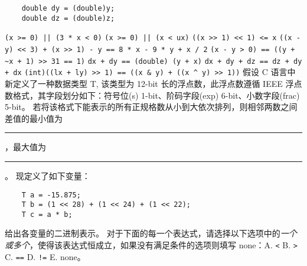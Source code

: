 \begin{problems}
\begin{verbatim}
    double dy = (double)y;
    double dz = (double)z;
		\end{verbatim}
			\qn \verb+(x >= 0) || (3 * x < 0)+
			\qn \verb+(x >= 0) || (x < ux)+
			\qn \verb|((x >> 1) << 1) <= x|
			\qn \verb|((x - y) << 3) + (x >> 1) - y == 8 * x - 9 * y + x / 2|
			\qn \verb|(x - y > 0) == ((y + ~x + 1) >> 31 == 1)|
			\qn \verb|dx + dy == (double) (y + x)|
			\qn \verb|dx + dy + dz == dz + dy + dx|
			\qn \verb|(int)((lx + ly) >> 1) == ((x & y) + ((x ^ y) >> 1))|
		 假设 C 语言中新定义了一种数据类型 T, 该类型为 12-bit 长的浮点数，此浮点数遵循 IEEE 浮点数格式，其字段划分如下：符号位(s) 1-bit、阶码字段(exp) 6-bit、小数字段(frac) 5-bit。
			\qn 若将该格式下能表示的所有正规格数从小到大依次排列，则相邻两数之间差值的最小值为 \rule{2.5cm}{0.25mm}，最大值为 \rule{2.5cm}{0.25mm}。
			\qn 现定义了如下变量：
			\begin{verbatim}
    T a = -15.875;
    T b = (1 << 28) + (1 << 24) + (1 << 22);
    T c = a * b;
			\end{verbatim}
			给出各变量的二进制表示。
		 对于下面的每一个表达式，请选择以下选项中的\emph{一个或多个}，使得该表达式恒成立，如果没有满足条件的选项则填写 none：A. \texttt{<} \quad B. \texttt{>} \quad C. \texttt{==} \quad D. \texttt{!=} \quad E. none。
		

\end{problems}
